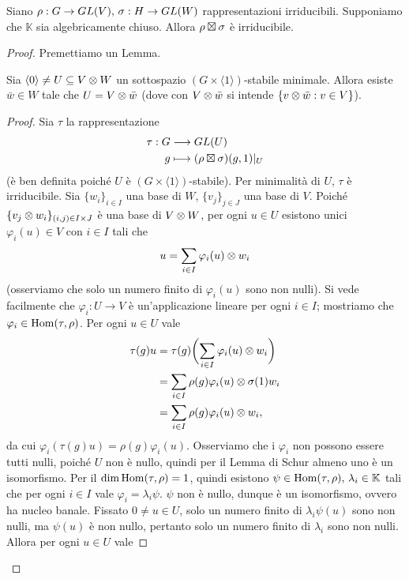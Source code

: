 \begin{proposition}
Siano $\rho:G\to GL(V),\,\allowbreak\sigma:H\to GL(W)$ rappresentazioni irriducibili. Supponiamo che $\mathbb{K}$ sia algebricamente chiuso. Allora $\rho\boxtimes\sigma$ è irriducibile.
\end{proposition}
\begin{proof}
Premettiamo un Lemma.
\begin{lemma*}
Sia $\langle0\rangle\neq U\subseteq V\otimes W$ un sottospazio $(G\times\langle1\rangle)$-stabile minimale. Allora esiste $\bar{w}\in W$ tale che $U=V\otimes\bar{w}$ (dove con $V\otimes\bar{w}$ si intende $\{v\otimes\bar{w}:v\in V\}$).
\end{lemma*}
\begin{proof}
Sia $\tau$ la rappresentazione
\begin{align*}
\tau:G&\longrightarrow GL(U)\\
g&\longmapsto (\rho\boxtimes\sigma)(g,1)|_U
\end{align*}
(è ben definita poiché $U$ è $(G\times\langle1\rangle)$-stabile). Per minimalità di $U$, $\tau$ è irriducibile. Sia $\{w_i\}_{i\in I}$ una base di $W$, $\{v_j\}_{j\in J}$ una base di $V$. Poiché $\{v_j\otimes w_i\}_{(i,j)\in I\times J}$ è una base di $V\otimes W$, per ogni $u\in U$ esistono unici $\varphi_i(u)\in V$ con $i\in I$ tali che
$$
u=\sum_{i\in I}\varphi_i(u)\otimes w_i
$$
(osserviamo che solo un numero finito di $\varphi_i(u)$ sono non nulli). Si vede facilmente che $\varphi_i:U\to V$ è un'applicazione lineare per ogni $i\in I$; mostriamo che $\varphi_i\in\operatorname{Hom}(\tau,\rho)$. Per ogni $u\in U$ vale
\begin{align*}
\tau(g)u&=\tau(g)\biggl(\sum_{i\in I}\varphi_i(u)\otimes w_i\biggr)\\
&=\sum_{i\in I}\rho(g)\varphi_i(u)\otimes\sigma(1)w_i\\
&=\sum_{i\in I}\rho(g)\varphi_i(u)\otimes w_i,
\end{align*}
da cui $\varphi_i(\tau(g)u)=\rho(g)\varphi_i(u)$. Osserviamo che i $\varphi_i$ non possono essere tutti nulli, poiché $U$ non è nullo, quindi per il Lemma di Schur almeno uno è un isomorfismo. Per il  $\dim\operatorname{Hom}(\tau,\rho)=1$, quindi esistono $\psi\in\operatorname{Hom}(\tau,\rho),\,\allowbreak\lambda_i\in\mathbb{K}$ tali che per ogni $i\in I$ vale $\varphi_i=\lambda_i\psi$. $\psi$ non è nullo, dunque è un isomorfismo, ovvero ha nucleo banale. Fissato $0\neq u\in U$, solo un numero finito di $\lambda_i\psi(u)$ sono non nulli, ma $\psi(u)$ è non nullo, pertanto solo un numero finito di $\lambda_i$ sono non nulli. Allora per ogni $u\in U$ vale

\end{proof}
\end{proof}
